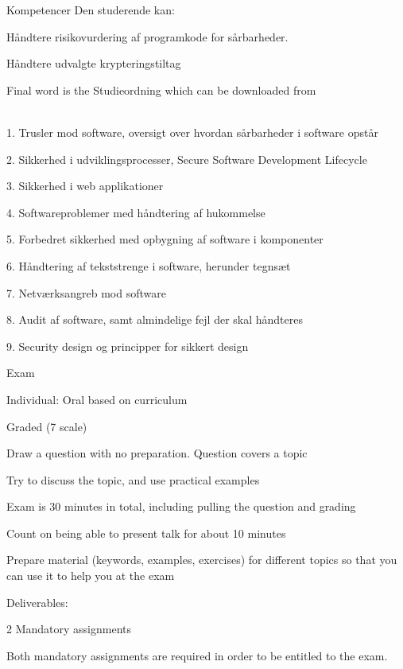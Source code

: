 \documentclass[Screen16to9,17pt]{foils}
\begin{document}
Kompetencer Den studerende kan:
\begin{list2}
\item Håndtere risikovurdering af programkode for sårbarheder.
\item Håndtere udvalgte krypteringstiltag
\end{list2}

Final word is the Studieordning which can be downloaded from\\
{\footnotesize {}\\
}



\begin{list2}
\item 1. Trusler mod software, oversigt over hvordan sårbarheder i software opstår
\item 2. Sikkerhed i udviklingsprocesser, Secure Software Development Lifecycle
\item 3. Sikkerhed i web applikationer
\item 4. Softwareproblemer med håndtering af hukommelse
\item 5. Forbedret sikkerhed med opbygning af software i komponenter
\item 6. Håndtering af tekststrenge i software, herunder tegnsæt
\item 7. Netværksangreb mod software
\item 8. Audit af software, samt almindelige fejl der skal håndteres
\item 9. Security design og principper for sikkert design
\end{list2}


\begin{list2}
\item Exam
\item Individual: Oral based on curriculum
\item Graded (7 scale)
\item Draw a question with no preparation. Question covers a topic
\item Try to discuss the topic, and use practical examples
\item Exam is 30 minutes in total, including pulling the question and grading
\item Count on being able to present talk for about 10 minutes
\item Prepare material (keywords, examples, exercises) for different topics so that you can use it to help you at the exam

\vskip 5mm
\item Deliverables:
\item 2 Mandatory assignments
\item Both mandatory assignments are required in order to be entitled to the exam.
\end{list2}
\end{document}
